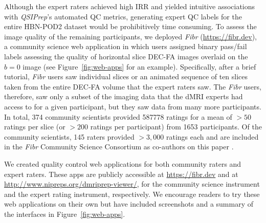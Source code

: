 \documentclass[fleqn,10pt,inline]{wlscirep}
\begin{document}
Although the expert raters achieved high IRR and yielded intuitive associations
with \emph{QSIPrep}'s automated QC metrics, generating expert QC labels for the
entire HBN-POD2 dataset would be prohibitively time consuming. To assess the
image quality of the remaining participants, we deployed \emph{Fibr}
(\url{https://fibr.dev}), a community science web application in which users
assigned binary pass/fail labels assessing the quality of horizontal slice DEC-FA
images overlaid on the $b=0$ image (see Figure~\ref{fig:web-apps} for an example).
Specifically, after a brief tutorial, \emph{Fibr} users saw individual
slices or an animated sequence of ten slices taken from the entire DEC-FA volume
that the expert raters saw. The \emph{Fibr} users, therefore, saw only a subset of
the imaging data that the dMRI experts had access to for a given participant, but they
saw data from many more participants. In total, \num{374} community scientists provided
\num{587778} ratings for a mean of $>50$ ratings per slice (or $>200$ ratings
per participant) from \num{1653} participants. Of the community scientists, \num{145}
raters provided $>3,000$ ratings each and are included in the \emph{Fibr} Community
Science Consortium as co-authors on this paper \cite{Ward-Fear2020-zq}.

We created quality control web applications for both community raters and expert raters. These apps are publicly accessible at \url{https://fibr.dev} and at \url{http://www.nipreps.org/dmriprep-viewer/}, for the community science instrument and the expert rating instrument, respectively. We encourage readers to try these web applications on their own but have included screenshots and a summary of the interfaces in Figure~\ref{fig:web-apps}.
\end{document}
